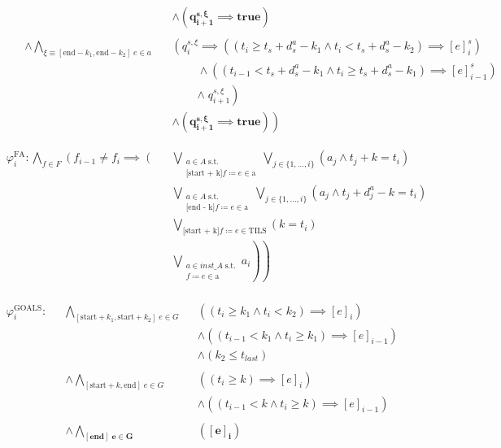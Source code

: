 \documentclass{article}
\begin{document}
\begin{align*}
  & && && \land \boldsymbol{\left( q_{i+1}^{s, \xi} \implies true \right)}\\ \\
  & && \land \bigwedge\limits_{\xi \equiv [\text{end}-k_1, \text{end}-k_2] \; e \in a} &&\left( q_i^{s, \xi} \implies \left( \left( t_i \geq t_s + d_s^a - k_1 \land t_i < t_s + d_s^a - k_2 \right) \implies [e]_{i}^s \right) \right.\\
  & && && \; \; \; \; \; \; \; \; \land \left( \left( t_{i-1} < t_s + d_s^a - k_1 \land t_i \geq t_s + d_s^a - k_1 \right) \implies [e]_{i-1}^s \right)\\
  & && && \; \; \; \; \; \; \; \; \left. \land \; q_{i+1}^{s, \xi} \right)\\
  & && && \land \boldsymbol{\left( q_{i+1}^{s, \xi} \implies true \right)} \left. \right)
\end{align*}

\begin{align*}
  &\varphi_{i}^{\text{FA}}: \bigwedge\limits_{f \in F} \left( f_{i-1} \neq f_{i} \implies \left( \right. \right. && \!\!\!\! \bigvee\limits_{\substack{a \in A \; \text{s.t.}\\ \text{[start + k]} f \coloneqq e \in \text{a}}} \bigvee\limits_{j \in \{1, \ldots, i\}}  \!\!\!\! \left( a_j \land t_j + k = t_i \right)\\
  & && \bigvee\limits_{\substack{a \in A \; \text{s.t.}\\ \text{[end - k]} f \coloneqq e \in \text{a}}} \bigvee\limits_{j \in \{1, \ldots, i\}}  \!\!\!\! \left( a_j \land t_j + d_j^a - k = t_i \right) \\
  & && \bigvee\limits_{\text{[start + k]} f \coloneqq e \in \text{TILS}} \left( k = t_i \right)\\
  & && \left. \left. \bigvee\limits_{\substack{a \in inst\_A \; \text{s.t.}\\ f \coloneqq e \in \text{a}}} a_i \right) \right)\\
\end{align*}

\begin{align*}
  &\varphi_{i}^{\text{GOALS}}: && \bigwedge\limits_{[\text{start}+k_1, \text{start}+k_2] \; e \in G} &&\left( \left(t_i \geq k_1 \land t_i < k_2 \right) \implies [e]_{i} \right)\\
  & && && \land \left( \left( t_{i-1} < k_1 \land t_i \geq k_1 \right) \implies [e]_{i-1} \right)\\
  & && && \land \left( k_2 \leq t_{last} \right) \\ \\
  & &&\land \bigwedge\limits_{[\text{start}+k, \text{end}] \; e \in G} &&\left( \left( t_i \geq k \right) \implies [e]_{i} \right)\\
  & && && \land \left( \left( t_{i-1} < k \land t_i \geq k \right) \implies [e]_{i-1} \right)\\ \\
  & &&\land \boldsymbol{\bigwedge\limits_{[\text{end}] \; e \in G}} &&\boldsymbol{\left( [e]_{i} \right)}\\
\end{align*}
\end{document}
